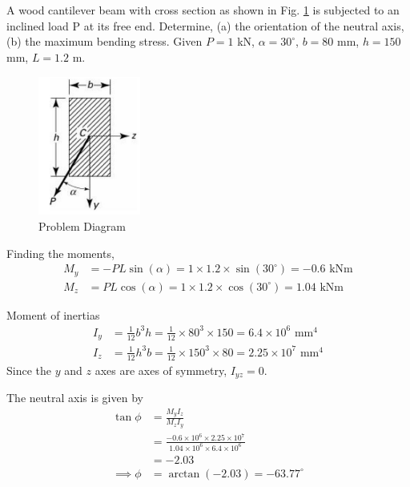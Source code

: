 \section{}
A wood cantilever beam with cross section as shown in Fig. \ref{fig:Q1ProblemDiagram} is subjected to an inclined load P
at its free end. Determine, (a) the orientation of the neutral axis, (b) the maximum bending stress. Given
$P = 1$ kN, $\alpha = 30^{\circ}$, $b =80$ mm, $h = 150$ mm, $L = 1.2$ m.

\begin{figure}[h]
    \centering
    \includegraphics[width=0.3\textwidth]{Questions/Figures/Q1ProblemDiagram.png}
    \caption{Problem Diagram}
    \label{fig:Q1ProblemDiagram}
\end{figure}

Finding the moments, 
\begin{align*}
    M_y &= -P L \sin(\alpha) = 1 \times 1.2 \times \sin(30^{\circ}) = -0.6 \text{ kNm}\\
    M_z &= P L \cos(\alpha) = 1 \times 1.2 \times \cos(30^{\circ}) = 1.04 \text{ kNm}
\end{align*}

Moment of inertias
\begin{align*}
    I_y &= \frac{1}{12} b^3 h = \frac{1}{12} \times 80^3 \times 150 = 6.4 \times 10^6 \text{ mm}^4\\
    I_z &= \frac{1}{12} h^3 b = \frac{1}{12} \times 150^3 \times 80 = 2.25 \times 10^7 \text{ mm}^4
\end{align*}
Since the $y$ and $z$ axes are axes of symmetry, $I_{yz} = 0$.

The neutral axis is given by
\begin{align*}
    \tan{\phi} &= \frac{M_y I_z}{M_z I_y} \\
    &= \frac{-0.6 \times 10^6 \times 2.25 \times 10^7}{1.04 \times 10^6 \times 6.4 \times 10^6} \\
    &= -2.03 \\
    \implies \phi &= \arctan(-2.03) = \boxed{-63.77^{\circ}}
\end{align*}

